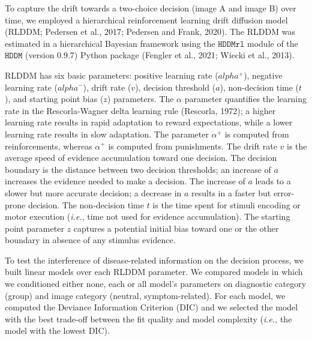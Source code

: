 \documentclass[
  man,floatsintext]{apa6}
\begin{document}
To capture the drift towards a two-choice decision (image A and image B) over time, we employed a hierarchical reinforcement learning drift diffusion model (RLDDM; Pedersen et al., 2017; Pedersen and Frank, 2020). The RLDDM was estimated in a hierarchical Bayesian framework using the \(\texttt{HDDMrl}\) module of the \(\texttt{HDDM}\) (version 0.9.7) Python package (Fengler et al., 2021; Wiecki et al., 2013).

RLDDM has six basic parameters: positive learning rate (\(alpha^+\)), negative learning rate (\(alpha^-\)), drift rate (\(v\)), decision threshold (\(a\)), non-decision time (\(t\)), and starting point bias (\(z\)) parameters. The \(\alpha\) parameter quantifies the learning rate in the Rescorla-Wagner delta learning rule (Rescorla, 1972); a higher learning rate results in rapid adaptation to reward expectations, while a lower learning rate results in slow adaptation. The parameter \(\alpha^+\) is computed from reinforcements, whereas \(\alpha^+\) is computed from punishments. The drift rate \(v\) is the average speed of evidence accumulation toward one decision. The decision boundary is the distance between two decision thresholds; an increase of \(a\) increases the evidence needed to make a decision. The increase of \(a\) leads to a slower but more accurate decision; a decrease in \(a\) results in a faster but error-prone decision. The non-decision time \(t\) is the time spent for stimuli encoding or motor execution (\emph{i.e.}, time not used for evidence accumulation). The starting point parameter \(z\) captures a potential initial bias toward one or the other boundary in absence of any stimulus evidence.

To test the interference of disease-related information on the decision process, we built linear models over each RLDDM parameter. We compared models in which we conditioned either none, each or all model's parameters on diagnostic category (group) and image category (neutral, symptom-related). For each model, we computed the Deviance Information Criterion (DIC) and we selected the model with the best trade-off between the fit quality and model complexity (\emph{i.e.}, the model with the lowest DIC).
\end{document}
